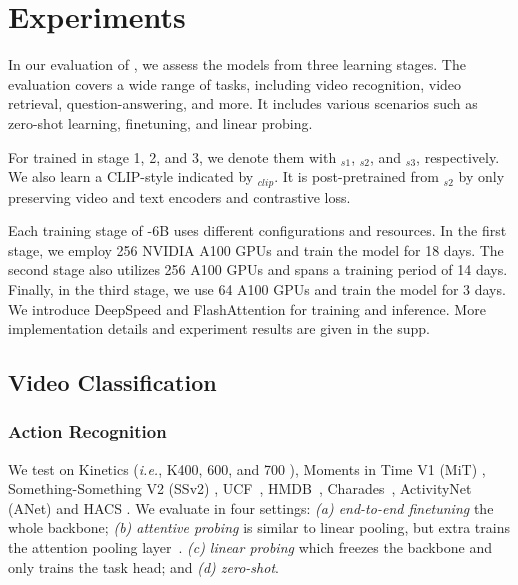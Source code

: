 \section{Experiments} \label{sec:exp}
In our evaluation of {\modelname}, we assess the models from three learning stages. The evaluation covers a wide range of tasks, including video recognition, video retrieval, question-answering, and more. It includes various scenarios such as zero-shot learning, finetuning, and linear probing. 

For {\modelname} trained in stage 1, 2, and 3, we denote them with {\modelname}$_{s1}$, {\modelname}$_{s2}$, and {\modelname}$_{s3}$, respectively. We also learn a CLIP-style {\modelname} indicated by {\modelname}$_{clip}$. It is post-pretrained from {\modelname}$_{s2}$ by only preserving video and text encoders and contrastive loss.

Each training stage of {\modelname}-6B uses different configurations and resources. In the first stage, we employ 256 NVIDIA A100 GPUs and train the model for 18 days. The second stage also utilizes 256 A100 GPUs and spans a training period of 14 days. Finally, in the third stage, we use 64 A100 GPUs and train the model for 3 days. We introduce DeepSpeed and FlashAttention \cite{dao2022flashattention} for training and inference.
More implementation details and experiment results are given in the supp.

\subsection{Video Classification}

\subsubsection{Action Recognition} \label{sec:cls}
We test {\modelname} on Kinetics (\textit{i.e.}, K400, 600, and 700 \cite{k400,k600,k700}), Moments in Time V1 (MiT) \cite{mit}, Something-Something V2 (SSv2) \cite{sth}, UCF~\cite{soomro2012ucf101}, HMDB~\cite{hmdb}, Charades~\cite{charades_sta}, ActivityNet~\cite{activitynet} (ANet) and HACS \cite{hacs}. We evaluate in four settings: 
\emph{(a) end-to-end finetuning} the whole backbone;
\emph{(b) attentive probing} is similar to linear pooling, but extra trains the attention pooling layer~\cite{coca}. 
\emph{(c) linear probing} which freezes the backbone and only trains the task head; and
\emph{(d) zero-shot}.

